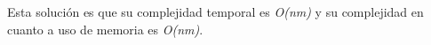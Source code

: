 Esta solución es que su complejidad temporal es {\em O(nm)} y su complejidad en cuanto a uso de memoria es {\em O(nm)}. 

